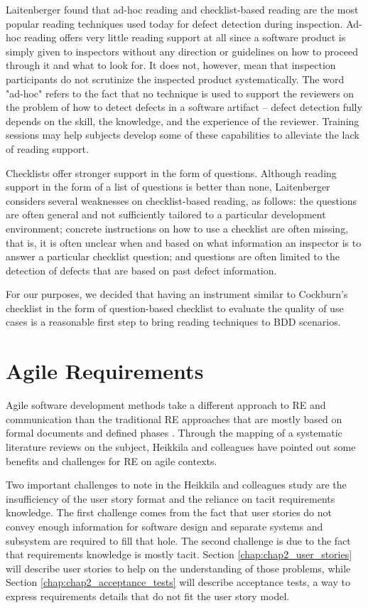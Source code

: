 Laitenberger \cite{Laitenberger_2002} found that ad-hoc reading and checklist-based reading are the most popular reading techniques used today for defect detection during inspection. Ad-hoc reading offers very little reading support at all since a software product is simply given to inspectors without any direction or guidelines on how to proceed through it and what to look for. It does not, however, mean that inspection participants do not scrutinize the inspected product systematically. The word "ad-hoc" refers to the fact that no technique is used to support the reviewers on the problem of how to detect defects in a software artifact -- defect detection fully depends on the skill, the knowledge, and the experience of the reviewer. Training sessions may help subjects develop some of these capabilities to alleviate the lack of reading support.

Checklists offer stronger support in the form of questions. Although reading support in the form of a list of questions is better than none, Laitenberger \cite{Laitenberger_2002} considers several weaknesses on checklist-based reading, as follows: the questions are often general and not sufficiently tailored to a particular development environment; concrete instructions on how to use a checklist are often missing, that is, it is often unclear when and based on what information an inspector is to answer a particular checklist question; and questions are often limited to the detection of defects that are based on past defect information. 

For our purposes, we decided that having an instrument similar to Cockburn's checklist \cite{Cockburn_2000} in the form of question-based checklist to evaluate the quality of use cases is a reasonable first step to bring reading techniques to BDD scenarios.

\section{Agile Requirements}

Agile software development methods take a different approach to RE and communication than the traditional RE approaches that are mostly based on formal documents and defined phases \cite{Heikkila_et_dot_al_2015}. Through the mapping of a systematic literature reviews on the subject, Heikkila and colleagues \cite{Heikkila_et_dot_al_2015} have pointed out some benefits and challenges for RE on agile contexts. 

Two important challenges to note in the Heikkila and colleagues study \cite{Heikkila_et_dot_al_2015} are the insufficiency of the user story format and the reliance on tacit requirements knowledge. The first challenge comes from the fact that user stories do not convey enough information for software design and separate systems and subsystem are required to fill that hole. The second challenge is due to the fact that requirements knowledge is mostly tacit. Section \ref{chap:chap2_user_stories} will describe user stories to help on the understanding of those problems, while Section \ref{chap:chap2_acceptance_tests} will describe acceptance tests, a way to express requirements details that do not fit the user story model. 

